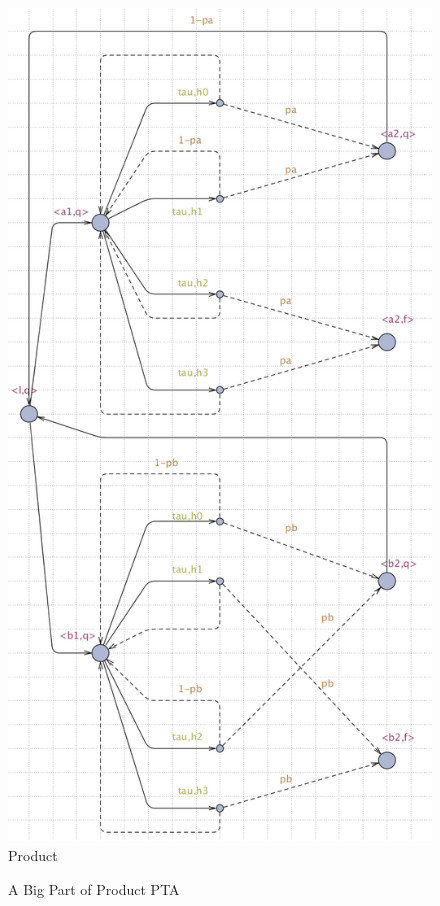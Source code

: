\begin{figure}
    \raggedright
    \begin{minipage}[t]{0.6\linewidth}  
        \raggedright
        \includegraphics[width=1.6\linewidth]{product.png}  
        \centering  
        \caption{Product}  
    \end{minipage}  
\end{figure}  

\begin{figure}
    \centering
    \resizebox{.5\textwidth}{!}{
        
        }
    \caption{A Big Part of Product PTA}
    \label{fig:product}  
\end{figure}